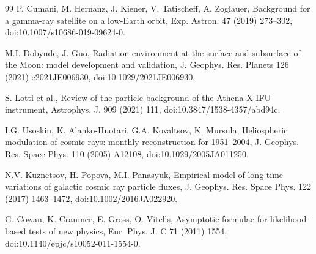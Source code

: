 \documentclass[11pt]{article}
\begin{document}
\begin{thebibliography}{99}
P. Cumani, M. Hernanz, J. Kiener, V. Tatischeff, A. Zoglauer,
Background for a gamma-ray satellite on a low-Earth orbit,
Exp. Astron. 47 (2019) 273--302,
doi:10.1007/s10686-019-09624-0.

M.I. Dobynde, J. Guo,
Radiation environment at the surface and subsurface of the Moon:
model development and validation,
J. Geophys. Res. Planets 126 (2021) e2021JE006930,
doi:10.1029/2021JE006930.

S. Lotti et al.,
Review of the particle background of the Athena X-IFU instrument,
Astrophys. J. 909 (2021) 111,
doi:10.3847/1538-4357/abd94c.

I.G. Usoskin, K. Alanko-Huotari, G.A. Kovaltsov, K. Mursula,
Heliospheric modulation of cosmic rays: monthly reconstruction for 1951--2004,
J. Geophys. Res. Space Phys. 110 (2005) A12108,
doi:10.1029/2005JA011250.

N.V. Kuznetsov, H. Popova, M.I. Panasyuk,
Empirical model of long-time variations of galactic cosmic ray particle fluxes,
J. Geophys. Res. Space Phys. 122 (2017) 1463--1472,
doi:10.1002/2016JA022920.

G. Cowan, K. Cranmer, E. Gross, O. Vitells, Asymptotic formulae for likelihood-based tests of new physics, Eur. Phys. J. C 71 (2011) 1554, doi:10.1140/epjc/s10052-011-1554-0.

\end{thebibliography}
\end{document}
